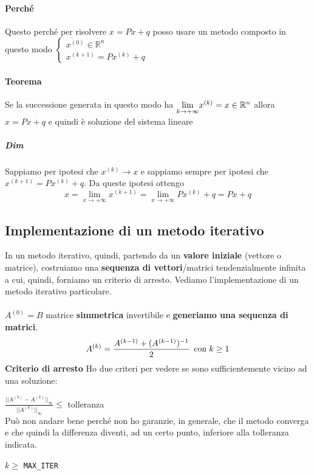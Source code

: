 \documentclass[10pt]{book}
\begin{document}
\paragraph{Perché} Questo perché per risolvere $x = Px + q$ posso usare un metodo composto in questo modo $\left\{ \begin{array}{l}
x^{(0)} \in \mathbb{R}^n\\
x^{(k + 1)} = Px^{(k)} + q
\end{array} \right.$
\paragraph{Teorema} Se la successione generata in questo modo ha $\mathlarger{\lim_{k\to +\infty}} x^{(k)} = x \in \mathbb{R}^n$ allora $x = Px + q$ e quindi è soluzione del sistema lineare
\subparagraph{Dim} Sappiamo per ipotesi che $x^{(k)} \rightarrow x$ e sappiamo sempre per ipotesi che $x^{(k + 1)} = Px^{(k)} + q$. Da queste ipotesi ottengo
$$x = \lim_{x\to +\infty}x^{(k + 1)} = \lim_{x\to +\infty} Px^{(k)} + q = Px + q$$
\subsection{Implementazione di un metodo iterativo}
In un metodo iterativo, quindi, partendo da un \textbf{valore iniziale} (vettore o matrice), costruiamo una \textbf{sequenza di vettori}/matrici tendenzialmente infinita a cui, quindi, forniamo un criterio di arresto. Vediamo l'implementazione di un metodo iterativo particolare.\\\\
$A^{(0)} = B$ matrice \textbf{simmetrica} invertibile e \textbf{generiamo una sequenza di matrici}.\\
$$A^{(k)} = \frac{A^{(k-1)} + (A^{(k-1)})^{-1}}{2}\:\:\textsl{con }k \geq 1$$
\textbf{Criterio di arresto} Ho due criteri per vedere se sono sufficientemente vicino ad una soluzione:
\begin{list}{}{}
	\item $\frac{||A^{(k)} - A^{(k)}||_{\infty}}{||A^{(k)}||_{\infty}} \leq$ tolleranza\\
	Può non andare bene perché non ho garanzie, in generale, che il metodo converga e che quindi la differenza diventi, ad un certo punto, inferiore alla tolleranza indicata.
	\item $k \geq$ \texttt{MAX\_ITER}
\end{list}
\end{document}
